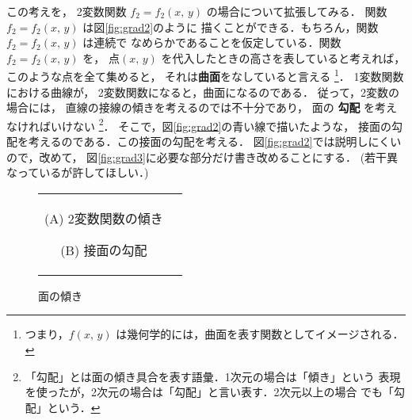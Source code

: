                     この考えを，
                    2変数関数 $f_{2}=f_{2}(x,\,y)$ の場合について拡張してみる．
                    関数 $f_{2}=f_{2}(x,\,y)$ は図\ref{fig:grad2}のように
                    描くことができる．もちろん，関数 $f_{2}=f_{2}(x,\,y)$ は連続で
                    なめらかであることを仮定している．関数 $f_{2}=f_{2}(x,\,y)$ を，
                    点$(x,\,y)$ を代入したときの高さを表していると考えれば，
                    このような点を全て集めると，
                    それは\textbf{曲面}をなしていると言える
                        \footnote{
                            つまり，$f(x,\,y)$ は幾何学的には，曲面を表す関数としてイメージされる．
                        }．
                    1変数関数における曲線が，
                    2変数関数になると，曲面になるのである．
                    従って，2変数の場合には，
                    直線の接線の傾きを考えるのでは不十分であり，
                    面の \textbf{勾配} を考えなければいけない
                        \footnote{
                                「勾配」とは面の傾き具合を表す語彙．1次元の場合は「傾き」という
                                表現を使ったが，2次元の場合は「勾配」と言い表す．2次元以上の場合
                                でも「勾配」という．
                        }．
                    そこで，図\ref{fig:grad2}の青い線で描いたような，
                    接面の勾配を考えるのである．この接面の勾配を考える．
                    図\ref{fig:grad2}では説明しにくいので，改めて，
                    図\ref{fig:grad3}に必要な部分だけ書き改めることにする．
                    (若干異なっているが許してほしい．)

                \begin{figure}[hbt]
                    \begin{tabular}{cc}
                        \begin{minipage}{0.5\hsize}
                                    \begin{center}
                                        {grad3.pdf}

                                        (A) 2変数関数の傾き
                                        \label{fig:grad3}
                                    \end{center}
                        \end{minipage}
                        \begin{minipage}{0.5\hsize}
                                    \begin{center}
                                        {grad4.pdf}

                                        (B) 接面の勾配
                                        \label{fig:grad4}
                                    \end{center}
                        \end{minipage}
                    \end{tabular}

                        \caption{面の傾き}
                \end{figure}

